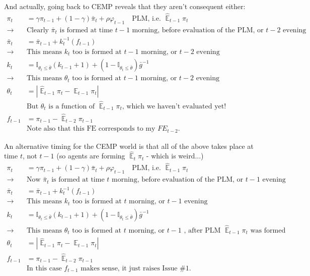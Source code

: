 \documentclass[11pt]{article}
\renewcommand{\[}{\begin{equation}}
\renewcommand{\]}{\end{equation}}
\DeclareMathOperator{\E}{\mathbb{E}}
\begin{document}
\newpage
And actually, going back to CEMP reveals that they aren't consequent either:
\begin{align*}
\pi_t & = \gamma\pi_{t-1} +(1-\gamma)\bar{\pi}_t + \rho \varphi_{t-1} \quad \text{PLM, i.e. } \hat{\E}_{t-1}\pi_t \\
\rightarrow \quad & \text{Clearly $\bar{\pi}_t$ is formed at time $t-1$ morning, before evaluation of the PLM, or $t-2$ evening} \\
\bar{\pi}_t & = \bar{\pi}_{t-1} + k_t^{-1}(f_{t-1}) \\
\rightarrow \quad & \text{This means $k_t$ too is formed at $t-1$ morning, or $t-2$ evening} \\
k_t & = \mathbb{I}_{\theta_t \leq \bar{\theta}}(k_{t-1} +1) + (1-\mathbb{I}_{\theta_t \leq \bar{\theta}})\bar{g}^{-1} \\
\rightarrow \quad & \text{This means $\theta_t$ too is formed at $t-1$ morning, or $t-2$ evening}  \\
\theta_t &= |\hat{\E}_{t-1}\pi_t - \E_{t-1}\pi_t| \\
&\text{But $\theta_t$ is a function of $\hat{\E}_{t-1}\pi_t $, which we haven't evaluated yet!} \\
f_{t-1} & = \pi_{t-1} - \hat{\E}_{t-2}\pi_{t-1} \\
& \text{Note also that this FE corresponds to my } FE_{t-2}. 
\end{align*}

An alternative timing for the CEMP world is that all of the above takes place at time $t$, not $t-1$ (so agents are forming $\hat{\E}_t\pi_t$ - which is weird...)
\begin{align*}
\pi_t & = \gamma\pi_{t-1} +(1-\gamma)\bar{\pi}_t + \rho \varphi_{t-1} \quad \text{PLM, i.e. } \hat{\E}_{t-1}\pi_t \\
\rightarrow \quad & \text{Now $\bar{\pi}_t$ is formed at time $t$ morning, before evaluation of the PLM, or $t-1$ evening} \\
\bar{\pi}_t & = \bar{\pi}_{t-1} + k_t^{-1}(f_{t-1}) \\
\rightarrow \quad & \text{This means $k_t$ too is formed at $t$ morning, or $t-1$ evening} \\
k_t & = \mathbb{I}_{\theta_t \leq \bar{\theta}}(k_{t-1} +1) + (1-\mathbb{I}_{\theta_t \leq \bar{\theta}})\bar{g}^{-1} \\
\rightarrow \quad & \text{This means $\theta_t$ too is formed at $t$ morning, or $t-1$ , after PLM $\hat{\E}_{t-1}\pi_t$ was formed}  \\
\theta_t &= |\hat{\E}_{t-1}\pi_t - \E_{t-1}\pi_t| \\
f_{t-1} & = \pi_{t-1} - \hat{\E}_{t-2}\pi_{t-1} \\
& \text{In this case $f_{t-1}$ makes sense, it just raises Issue \#1}. 
\end{align*}
\end{document}
